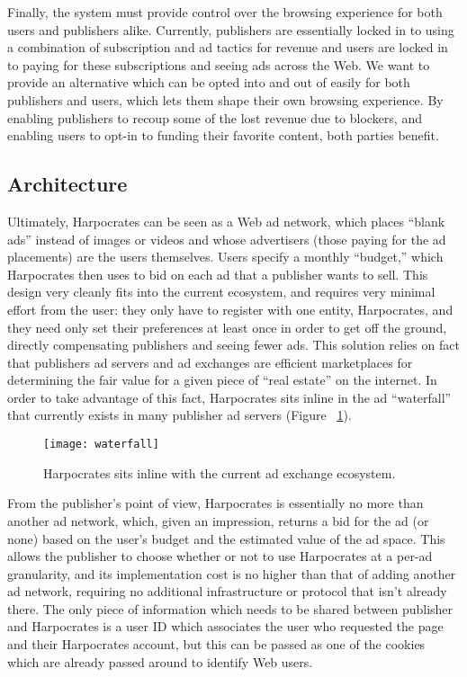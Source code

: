 Finally, the system must provide control over the browsing experience for both users and publishers alike.
Currently, publishers are essentially locked in to using a combination of subscription and ad tactics for revenue and users are locked in to paying for these subscriptions and seeing ads across the Web.
We want to provide an alternative which can be opted into and out of easily for both publishers and users, which lets them shape their own browsing experience.
By enabling publishers to recoup some of the lost revenue due to blockers, and enabling users to opt-in to funding their favorite content, both parties benefit.

\subsection{Architecture}
Ultimately, Harpocrates can be seen as a Web ad network, which places ``blank ads'' instead of images or videos and whose advertisers (those paying for the ad placements) are the users themselves.
Users specify a monthly ``budget,'' which Harpocrates then uses to bid on each ad that a publisher wants to sell.
This design very cleanly fits into the current ecosystem, and requires very minimal effort from the user: they only have to register with one entity, Harpocrates, and they need only set their preferences at least once in order to get off the ground, directly compensating publishers and seeing fewer ads.
This solution relies on fact that publishers ad servers and ad exchanges are efficient marketplaces for determining the fair value for a given piece of ``real estate'' on the internet.
In order to take advantage of this fact, Harpocrates sits inline in the ad ``waterfall'' that currently exists in many publisher ad servers (Figure ~\ref{fig:waterfall}).

\begin{figure}[t]
\centering
\texttt{[image: waterfall]}
\caption{Harpocrates sits inline with the current ad exchange ecosystem.}
\label{fig:waterfall}
\end{figure}

From the publisher's point of view, Harpocrates is essentially no more than another ad network, which, given an impression, returns a bid for the ad (or none) based on the user's budget and the estimated value of the ad space.
This allows the publisher to choose whether or not to use Harpocrates at a per-ad granularity, and its implementation cost is no higher than that of adding another ad network, requiring no additional infrastructure or protocol that isn't already there.
The only piece of information which needs to be shared between publisher and Harpocrates is a user ID which associates the user who requested the page and their Harpocrates account, but this can be passed as one of the cookies which are already passed around to identify Web users.

